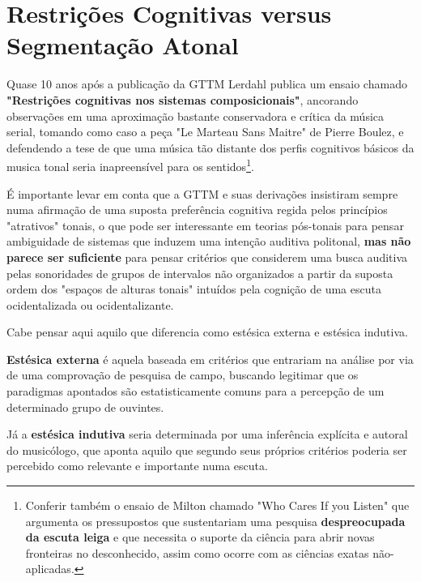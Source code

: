 \documentclass[
	12pt,				%
	openright,			%
	twoside,			%
	a4paper,			%
	english,			%
	french,				%
	spanish,			%
	brazil				%
	]{abntex2}
\begin{document}
\cite{temperley1999s}



\pagebreak
\section{Restrições Cognitivas versus Segmentação Atonal}


Quase 10 anos após a publicação da GTTM Lerdahl publica um ensaio chamado \textbf{"Restrições cognitivas nos sistemas composicionais"}\cite{lerdahl1992cognitive}, ancorando observações em uma aproximação bastante conservadora e crítica da música serial, tomando como caso a peça "Le Marteau Sans Maitre" de Pierre Boulez, e defendendo a tese de que uma música tão distante dos perfis cognitivos básicos da musica tonal seria inapreensível para os sentidos\footnote{Conferir também o ensaio de Milton  chamado "Who Cares If you Listen" que argumenta os pressupostos que sustentariam uma pesquisa \textbf{despreocupada da escuta leiga} e que necessita o suporte da ciência para abrir novas fronteiras no desconhecido, assim como ocorre com as ciências exatas não-aplicadas. }. 

É importante levar em conta que a GTTM e suas derivações insistiram sempre numa afirmação de uma suposta preferência cognitiva regida pelos princípios "atrativos" tonais, o que pode ser interessante em teorias pós-tonais para pensar ambiguidade de sistemas que induzem uma intenção auditiva politonal, \textbf{mas não parece ser suficiente }para pensar critérios que considerem uma busca auditiva pelas sonoridades de grupos de intervalos não organizados a partir da suposta ordem dos "espaços de alturas tonais"\cite{lerdahl1988tps} intuídos pela cognição de uma escuta ocidentalizada ou ocidentalizante.

Cabe pensar aqui aquilo que  diferencia como estésica externa e estésica indutiva. 

\textbf{Estésica externa} é aquela baseada em critérios que entrariam na análise por via de uma comprovação de pesquisa de campo, buscando legitimar que os paradigmas apontados são estatisticamente comuns para a percepção de um determinado grupo de ouvintes. 

Já a \textbf{estésica indutiva} seria determinada por uma inferência explícita e autoral do musicólogo, que aponta aquilo que segundo seus próprios critérios poderia ser percebido como relevante e importante numa escuta. 
\end{document}
